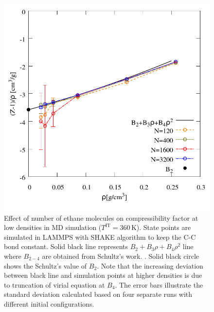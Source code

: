 \documentclass[%
 aip,
 jcp,
 sd,%
 amsmath,amssymb,
 reprint,%
]{revtex4-1}
\begin{document}
\begin{figure}
\includegraphics[scale=0.3]{Figures/FSE_TraPPE-C2_Lammps-rigid_IT.png}
\caption{Effect of number of ethane molecules on compressibility factor at low densities in MD simulation ($T^{\mathrm{IT}}=360 \, \mathrm{K}$). State points are simulated in LAMMPS with SHAKE algorithm to keep the C-C bond constant. Solid black line represents $B_2+B_3 \rho+B_4 \rho^2$ line where $B_{2-4}$ are obtained from Schultz's work. \cite{Schultz2010a}. Solid black circle shows the Schultz's value of $B_2$. Note that the increasing  deviation between black line and simulation points at higher densities is due to truncation of virial equation at $B_4$. The error bars illustrate the standard deviation calculated based on four separate runs with different initial configurations.
}
\label{fig:FSE_TraPPE_C2_Lammps_rigid_IT}
\end{figure}
\end{document}
